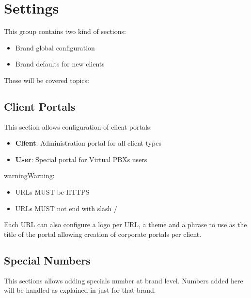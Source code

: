 \documentclass[letterpaper,10pt,english]{sphinxmanual}
\begin{document}
\section{Settings}
\label{administration_portal/brand/settings/index::doc}\label{administration_portal/brand/settings/index:settings}
This group contains two kind of sections:
\begin{itemize}
\item {} 
Brand global configuration

\item {} 
Brand defaults for new clients

\end{itemize}

These will be covered topics:


\subsection{Client Portals}
\label{administration_portal/brand/settings/client_portals:client-portals}\label{administration_portal/brand/settings/client_portals::doc}\label{administration_portal/brand/settings/client_portals:id1}
This section allows configuration of client portals:
\begin{itemize}
\item {} 
\textbf{Client}: Administration portal for all client types

\item {} 
\textbf{User}: Special portal for Virtual PBXs users

\end{itemize}

\begin{notice}{warning}{Warning:}\begin{itemize}
\item {} 
URLs MUST be HTTPS

\item {} 
URLs MUST not end with slash /

\end{itemize}
\end{notice}

Each URL can also configure a logo per URL, a theme and a phrase to use as
the title of the portal allowing creation of corporate portals per client.


\subsection{Special Numbers}
\label{administration_portal/brand/settings/special_numbers:special-numbers}\label{administration_portal/brand/settings/special_numbers::doc}
This sections allows adding specials number at brand level. Numbers added here will be handled as explained in
{\hyperref[administration_portal/platform/global_special_numbers:global\string-special\string-numbers]{}} just for that brand.
\end{document}
